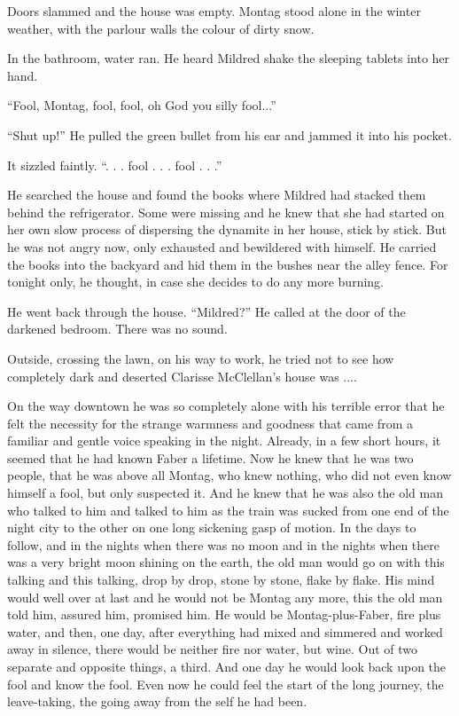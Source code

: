 \documentclass[11pt,openany]{book}
\begin{document}
Doors slammed and the house was empty. Montag stood alone in the winter weather, with the parlour walls the colour of dirty snow.

In the bathroom, water ran. He heard Mildred shake the sleeping tablets into her hand.

``Fool, Montag, fool, fool, oh God you silly fool...''

``Shut up!'' He pulled the green bullet from his ear and jammed it into his pocket.

It sizzled faintly. ``. . . fool . . . fool . . .''

He searched the house and found the books where Mildred had stacked them behind the refrigerator. Some were missing and he knew that she had started on her own slow process of dispersing the dynamite in her house, stick by stick. But he was not angry now, only exhausted and bewildered with himself. He carried the books into the backyard and hid them in the bushes near the alley fence. For tonight only, he thought, in case she decides to do any more burning.

He went back through the house. ``Mildred?'' He called at the door of the darkened bedroom. There was no sound.

Outside, crossing the lawn, on his way to work, he tried not to see how completely dark and deserted Clarisse McClellan's house was ....

On the way downtown he was so completely alone with his terrible error that he felt the necessity for the strange warmness and goodness that came from a familiar and gentle voice speaking in the night. Already, in a few short hours, it seemed that he had known Faber a lifetime. Now he knew that he was two people, that he was above all Montag, who knew nothing, who did not even know himself a fool, but only suspected it. And he knew that he was also the old man who talked to him and talked to him as the train was sucked from one end of the night city to the other on one long sickening gasp of motion. In the days to follow, and in the nights when there was no moon and in the nights when there was a very bright moon shining on the earth, the old man would go on with this talking and this talking, drop by drop, stone by stone, flake by flake. His mind would well over at last and he would not be Montag any more, this the old man told him, assured him, promised him. He would be Montag-plus-Faber, fire plus water, and then, one day, after everything had mixed and simmered and worked away in silence, there would be neither fire nor water, but wine. Out of two separate and opposite things, a third. And one day he would look back upon the fool and know the fool. Even now he could feel the start of the long journey, the leave-taking, the going away from the self he had been.
\end{document}
